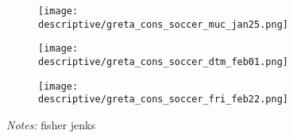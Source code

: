 \begin{figure}[H]\centering
	\caption{Participation soccer games}
	\label{fig_greta_cons:participation_soccer_games}
	\begin{subfigure}[h]{0.45\linewidth}\centering
		\texttt{[image: descriptive/greta\_cons\_soccer\_muc\_jan25.png]}
	\end{subfigure}
	\begin{subfigure}[h]{0.45\linewidth}\centering
		\texttt{[image: descriptive/greta\_cons\_soccer\_dtm\_feb01.png]}
	\end{subfigure}
	\begin{subfigure}[h]{0.45\linewidth}\centering
		\texttt{[image: descriptive/greta\_cons\_soccer\_fri\_feb22.png]}
	\end{subfigure}
	
	\begin{minipage}{0.9\linewidth}
		\scriptsize{\emph{Notes:} fisher jenks}
	\end{minipage}
\end{figure}


